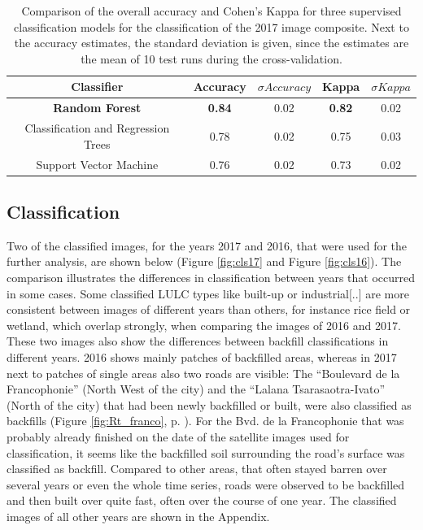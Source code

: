 \documentclass[11pt, A4, oneside]{report}
\begin{document}
\begin{table}[ht]
\centering
\caption{Comparison of the overall accuracy and Cohen's Kappa for three supervised classification models for the classification of the 2017 image composite. Next to the accuracy estimates, the standard deviation is given, since the estimates are the mean of 10 test runs during the cross-validation.} 
\begin{tabular}{ccccc}
  \hline
 Classifier & Accuracy & $\sigma Accuracy$ & Kappa & $\sigma Kappa$ \\ 
  \hline
\textbf{Random Forest} &\textbf{ 0.84} & 0.02 &\textbf{ 0.82} & 0.02 \\
Classification and Regression Trees & 0.78 & 0.02 & 0.75 & 0.03 \\ 
Support Vector Machine & 0.76 & 0.02 & 0.73 & 0.02 \\ 
   \hline
\end{tabular}
\label{tab:10Fcv_res}
\end{table}

\subsection{Classification}\label{chap:classifiedmaps}
Two of the classified images, for the years 2017 and 2016, that were used for the further analysis, are shown below (Figure \ref{fig:cls17} and Figure \ref{fig:cls16}). The comparison illustrates the differences in classification between years that occurred in some cases. Some classified LULC types like built-up or industrial[..] are more consistent between images of different years than others, for instance rice field or wetland, which overlap strongly, when comparing the images of 2016 and 2017. These two images also show the differences between backfill classifications in different years. 2016 shows mainly patches of backfilled areas, whereas in 2017 next to patches of single areas also two roads are visible: The ``Boulevard de la Francophonie'' (North West of the city) and the ``Lalana Tsarasaotra-Ivato'' (North of the city) that had been newly backfilled or built, were also classified as backfills (Figure \ref{fig:Rt_franco}, p. \pageref{fig:Rt_franco}). For the Bvd. de la Francophonie that was probably already finished on the date of the satellite images used for classification, it seems like the backfilled soil surrounding the road's surface was classified as backfill. Compared to other areas, that often stayed barren over several years or even the whole time series, roads were observed to be backfilled and then built over quite fast, often over the course of one year. The classified images of all other years are shown in the Appendix.
\end{document}

